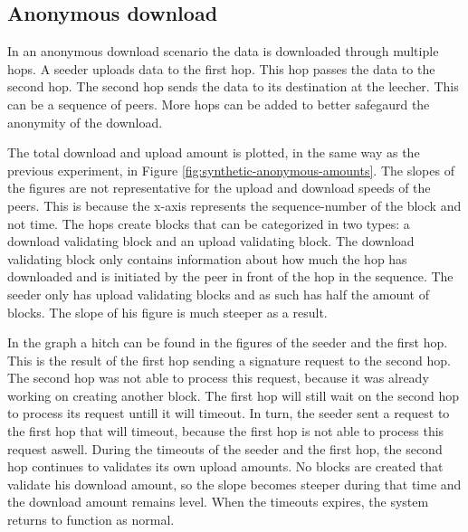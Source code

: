 \subsection{Anonymous download}
In an anonymous download scenario the data is downloaded through multiple hops.
A seeder uploads data to the first hop.
This hop passes the data to the second hop.
The second hop sends the data to its destination at the leecher.
This can be a sequence of peers.
More hops can be added to better safegaurd the anonymity of the download.

The total download and upload amount is plotted, in the same way as the previous experiment,
in Figure \ref{fig:synthetic-anonymous-amounts}.
The slopes of the figures are not representative for the upload and download speeds of the peers.
This is because the x-axis represents the sequence-number of the block and not time.
The hops create blocks that can be categorized in two types:
a download validating block and an upload validating block.
The download validating block only contains information about how much the hop has downloaded
and is initiated by the peer in front of the hop in the sequence.
The seeder only has upload validating blocks and as such has half the amount of blocks.
The slope of his figure is much steeper as a result.

In the graph a hitch can be found in the figures of the seeder and the first hop.
This is the result of the first hop sending a signature request to the second hop.
The second hop was not able to process this request,
because it was already working on creating another block.
The first hop will still wait on the second hop to process its request untill it will timeout.
In turn, the seeder sent a request to the first hop that will timeout,
because the first hop is not able to process this request aswell.
During the timeouts of the seeder and the first hop,
the second hop continues to validates its own upload amounts.
No blocks are created that validate his download amount,
so the slope becomes steeper during that time and the download amount remains level.
When the timeouts expires, the system returns to function as normal.

